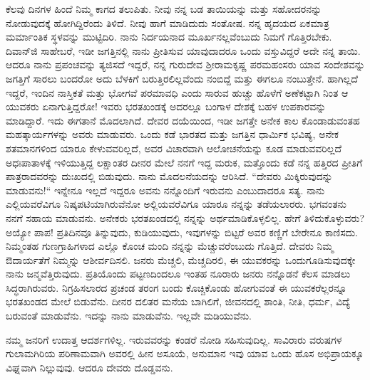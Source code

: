 ಕೆಲವು ದಿನಗಳ ಹಿಂದೆ ನಿಮ್ಮ ಕಾಗದ ತಲುಪಿತು. ನೀವು ನನ್ನ ಬಡ ತಾಯಿಯನ್ನು ಮತ್ತು ಸಹೋದರನನ್ನು ನೋಡುವುದಕ್ಕೆ ಹೋಗಿದ್ದಿರೆಂದು ತಿಳಿದೆ. ನೀವು ಹಾಗೆ ಮಾಡಿದುದು ಸಂತೋಷ. ನನ್ನ ಹೃದಯದ ಏಕಮಾತ್ರ ಮರ್ಮಾಂತಿಕ ಸ್ಥಳವನ್ನು ಮುಟ್ಟಿದಿರಿ. ನಾನು ನಿರ್ದಯನಾದ ಮೂರ್ಖನಲ್ಲವೆಂಬುದು ನಿಮಗೆ ಗೊತ್ತಿರಬೇಕು. ದಿವಾನ್‌ಜಿ ಸಾಹೇಬರೆ, ಇಡೀ ಜಗತ್ತಿನಲ್ಲಿ ನಾನು ಪ್ರೀತಿಸುವ ಯಾವುದಾದರೂ ಒಂದು ವಸ್ತುವಿದ್ದರೆ ಅದೇ ನನ್ನ ತಾಯಿ. ಆದರೂ ನಾನು ಪ್ರಪಂಚವನ್ನು ತ್ಯಜಿಸದೆ ಇದ್ದರೆ, ನನ್ನ ಗುರುದೇವ ಶ‍್ರೀರಾಮಕೃಷ್ಣ ಪರಮಹಂಸರು ಯಾವ ಸಂದೇಶವನ್ನು ಜಗತ್ತಿಗೆ ಸಾರಲು ಬಂದರೋ ಅದು ಬೆಳಕಿಗೆ ಬರುತ್ತಿರಲಿಲ್ಲವೆಂದು ನಂಬಿದ್ದೆ ಮತ್ತು ಈಗಲೂ ನಂಬುತ್ತೇನೆ. ಹಾಗಿಲ್ಲದೆ ಇದ್ದರೆ, ಇಂದಿನ ನಾಸ್ತಿಕತೆ ಮತ್ತು ಭೋಗವೆ ಪರಮಾವಧಿ ಎಂದು ಸಾರುವ ಹುಚ್ಚು ಹೊಳೆಗೆ ಅಣೆಕಟ್ಟಾಗಿ ನಿಂತ ಆ ಯುವಕರು ಏನಾಗುತ್ತಿದ್ದರೋ! ಇವರು ಭರತಖಂಡಕ್ಕೆ ಅದರಲ್ಲೂ ಬಂಗಾಳ ದೇಶಕ್ಕೆ ಬಹಳ ಉಪಕಾರವನ್ನು ಮಾಡಿದ್ದಾರೆ. ಇದು ಈಗತಾನೆ ಮೊದಲಾಗಿದೆ. ದೇವರ ದಯೆಯಿಂದ, ಇಡೀ ಜಗತ್ತೇ ಅನೇಕ ಕಾಲ ಕೊಂಡಾಡುವಂತಹ ಮಹತ್ಕಾರ್ಯಗಳನ್ನು ಅವರು ಮಾಡುವರು. ಒಂದು ಕಡೆ ಭಾರತದ ಮತ್ತು ಜಗತ್ತಿನ ಧಾರ್ಮಿಕ ಭವಿಷ್ಯ, ಅನೇಕ ಶತಮಾನಗಳಿಂದ ಯಾರೂ ಕೇಳುವವರಿಲ್ಲದೆ, ಅವರ ವಿಚಾರವಾಗಿ ಆಲೋಚನೆಯನ್ನು ಕೂಡ ಮಾಡುವವರಿಲ್ಲದೆ ಅಧಃಪಾತಾಳಕ್ಕೆ ಇಳಿಯುತ್ತಿದ್ದ ಲಕ್ಷಾಂತರ ದೀನರ ಮೇಲೆ ನನಗೆ ಇದ್ದ ಮರುಕ, ಮತ್ತೊಂದು ಕಡೆ ನನ್ನ ಹತ್ತಿರದ ಪ್ರೀತಿಗೆ ಪಾತ್ರರಾದವರನ್ನು ದುಃಖದಲ್ಲಿ ಬಿಡುವುದು. ನಾನು ಮೊದಲನೆಯದನ್ನು ಆರಿಸಿದೆ. “ದೇವರು ಮಿಕ್ಕಿರುವುದನ್ನು ಮಾಡುವನು!“ ಇನ್ನೇನೂ ಇಲ್ಲದೆ ಇದ್ದರೂ ಅವನು ನನ್ನೊಂದಿಗೆ ಇರುವನು ಎಂಬುದಾದರೂ ಸತ್ಯ. ನಾನು ಎಲ್ಲಿಯವರೆವಿಗೂ ನಿಷ್ಕಪಟಿಯಾಗಿರುವೆನೋ ಅಲ್ಲಿಯವರೆವಿಗೂ ಯಾರೂ ನನ್ನನ್ನು ತಡೆಯಲಾರರು. ಭಗವಂತನು ನನಗೆ ಸಹಾಯ ಮಾಡುವನು. ಅನೇಕರು ಭರತಖಂಡದಲ್ಲಿ ನನ್ನನ್ನು ಅರ್ಥಮಾಡಿಕೊಳ್ಳಲಿಲ್ಲ. ಹೇಗೆ ತಿಳಿದುಕೊಳ್ಳುವರು? ಅಯ್ಯೋ ಪಾಪ! ಪ್ರತಿದಿನವೂ ತಿನ್ನುವುದು, ಕುಡಿಯುವುದು, ಇವುಗಳನ್ನು ಬಿಟ್ಟರೆ ಅವರ ಕಣ್ಣಿಗೆ ಬೇರೇನೂ ಕಾಣಿಸದು. ನಿಮ್ಮಂತಹ ಗುಣಗ್ರಾಹಿಗಳಾದ ಎಲ್ಲೊ ಕೊಂಚ ಮಂದಿ ನನ್ನನ್ನು ಮೆಚ್ಚುವರೆಂಬುದು ಗೊತ್ತಿದೆ. ದೇವರು ನಿಮ್ಮ ಔದಾರ್ಯತೆಗೆ ನಿಮ್ಮನ್ನು ಆಶೀರ್ವದಿಸಲಿ. ಜನರು ಮೆಚ್ಚಲಿ, ಮೆಚ್ಚದಿರಲಿ, ಈ ಯುವಕರನ್ನು ಒಂದುಗೂಡಿಸುವುದಕ್ಕೇ ನಾನು ಜನ್ಮವೆತ್ತಿರುವುದು. ಪ್ರತಿಯೊಂದು ಪಟ್ಟಣದಿಂದಲೂ ಇಂತಹ ನೂರಾರು ಜನರು ನನ್ನೊಡನೆ ಕೆಲಸ ಮಾಡಲು ಸಿದ್ಧರಾಗಿರುವರು. ನಿಗ್ರಹಿಸಲಾರದ ಪ್ರಚಂಡ ತರಂಗ ಬಂದು ಕೊಚ್ಚಿಕೊಂಡು ಹೋಗುವಂತೆ ಈ ಯುವಕರೆಲ್ಲರನ್ನೂ ಭರತಖಂಡದ ಮೇಲೆ ಬಿಡುವೆನು. ದೀನರ ದಲಿತರ ಮನೆಯ ಬಾಗಿಲಿಗೆ, ಜೀವನದಲ್ಲಿ ಶಾಂತಿ, ನೀತಿ, ಧರ್ಮ, ವಿದ್ಯೆ ಬರುವಂತೆ ಮಾಡುವೆನು. ಇದನ್ನು ನಾನು ಮಾಡುವೆನು. ಇಲ್ಲವೇ ಮಡಿಯುವೆನು.

ನಮ್ಮ ಜನರಿಗೆ ಉದಾತ್ತ ಆದರ್ಶಗಳಿಲ್ಲ. ಇರುವವರನ್ನು ಕಂಡರೆ ನೋಡಿ ಸಹಿಸುವುದಿಲ್ಲ. ಸಾವಿರಾರು ವರುಷಗಳ ಗುಲಾಮಗಿರಿಯ ಪರಿಣಾಮವಾಗಿ ಅವರಲ್ಲಿ ಹೀನ ಅಸೂಯೆ, ಅನುಮಾನ ಇವು ಯಾವ ಒಂದು ಹೊಸ ಅಭಿಪ್ರಾಯಕ್ಕೂ ವಿಘ್ನವಾಗಿ ನಿಲ್ಲುವುವು. ಆದರೂ ದೇವರು ದೊಡ್ಡವನು.

